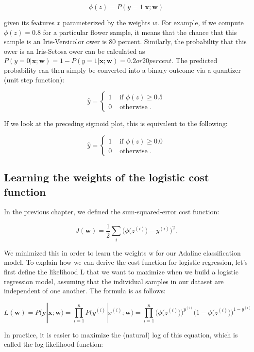 \documentclass[letterpaper]{report}
\begin{document}
\[
\phi(z) = P(y=1 | \mathbf{x}; \mathbf{w})
\]

given its features $x$ parameterized by the weights $w$. For example, if we compute $\phi(z) = 0.8$ for a particular flower sample, it means that the chance that this sample is an Iris-Versicolor  ower is 80 percent. Similarly, the probability that this  ower is an Iris-Setosa  ower can be calculated as $P(y=0 | \mathbf{x};\mathbf{w})=1 - P (y=1 | \mathbf{x}; \mathbf{w}) = 0.2 or 20 percent.$ The predicted probability can then simply be converted into a binary outcome via a quantizer (unit step function):

\[ \hat{y}= \begin{cases} 
      1 & \text{ if } \phi(z) \ge 0.5 \\
      0 & \text{ otherwise }.
   \end{cases}
\]

If we look at the preceding sigmoid plot, this is equivalent to the following:

\[ \hat{y}= \begin{cases} 
      1 & \text{ if } \phi(z) \ge 0.0 \\
      0 & \text{ otherwise }.
   \end{cases}
\]

\subsection{Learning the weights of the logistic cost function}

In the previous chapter, we defined the sum-squared-error cost function: 

\[
J(\mathbf{w}) = \frac{1}{2} \sum_i \bigg( \phi \big( z^{(i)} \big) - y^{(i)}  \bigg)^2.
\]

We minimized this in order to learn the weights w for our Adaline classification model. To explain how we can derive the cost function for logistic regression, let's  first define the likelihood L that we want to maximize when we build a logistic regression model, assuming that the individual samples in our dataset are independent of one another. The formula is as follows:

\[
L(\mathbf{w}) = P(\mathbf{y} | \mathbf{x}; \mathbf{w}) = \prod_{i=1}^{n} P \big( y^{(i)} | x^{(i)}; \mathbf{w} \big) =  \prod_{i=1}^{n} \bigg( \phi \big(z^{(i)} \big) \bigg) ^ {y^{(i)}} \bigg( 1 - \phi \big( z^{(i)} \big) \bigg)^{1-y^{(i)}}
\]

In practice, it is easier to maximize the (natural) log of this equation, which is called
the log-likelihood function:
\end{document}

